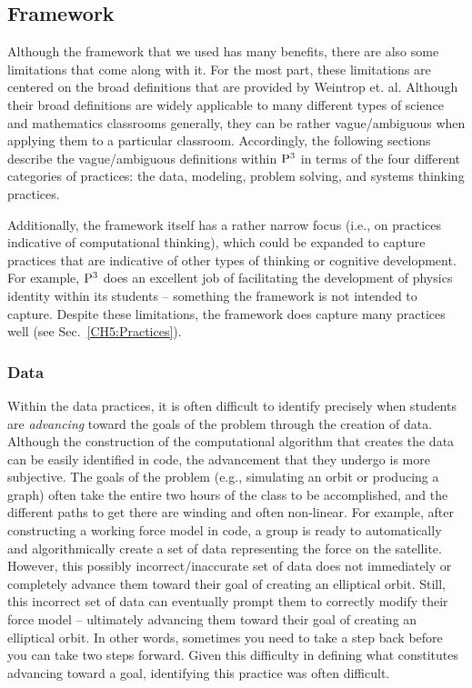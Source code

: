 \documentclass{msuphddissertation}
\begin{document}
\begin{doublespace}
\subsection{Framework}

Although the framework that we used has many benefits, there are also some limitations that come along with it.  For the most part, these limitations are centered on the broad definitions that are provided by Weintrop et. al.  Although their broad definitions are widely applicable to many different types of science and mathematics classrooms generally, they can be rather vague/ambiguous when applying them to a particular classroom.  Accordingly, the following sections describe the vague/ambiguous definitions within ${\rm P}^{3}$ in terms of the four different categories of practices: the data, modeling, problem solving, and systems thinking practices.

Additionally, the framework itself has a rather narrow focus (i.e., on practices indicative of computational thinking), which could be expanded to capture practices that are indicative of other types of thinking or cognitive development.  For example, ${\rm P}^{3}$ does an excellent job of facilitating the development of physics identity within its students -- something the framework is not intended to capture.  Despite these limitations, the framework does capture many practices well (see Sec.~\ref{CH5:Practices}). 

\subsubsection{Data}

Within the data practices, it is often difficult to identify precisely when students are \textit{advancing} toward the goals of the problem through the creation of data.  Although the construction of the computational algorithm that creates the data can be easily identified in code, the advancement that they undergo is more subjective.  The goals of the problem (e.g., simulating an orbit or producing a graph) often take the entire two hours of the class to be accomplished, and the different paths to get there are winding and often non-linear.  For example, after constructing a working force model in code, a group is ready to automatically and algorithmically create a set of data representing the force on the satellite.  However, this possibly incorrect/inaccurate set of data does not immediately or completely advance them toward their goal of creating an elliptical orbit.  Still, this incorrect set of data can eventually prompt them to correctly modify their force model -- ultimately advancing them toward their goal of creating an elliptical orbit.  In other words, sometimes you need to take a step back before you can take two steps forward.  Given this difficulty in defining what constitutes advancing toward a goal, identifying this practice was often difficult.


\end{doublespace}
\end{document}
